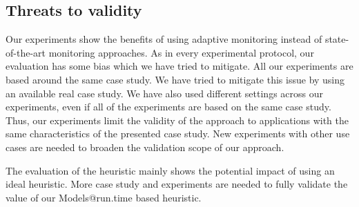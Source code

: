 \subsection{Threats to validity}
Our experiments show the benefits of using adaptive monitoring instead of state-of-the-art monitoring approaches.
As in every experimental protocol, our evaluation has some bias which we have tried to mitigate.
All our experiments are based around the same case study. 
We have tried to mitigate this issue by using an available real case study.
We have also used different settings across our experiments, even if all of the experiments are based on the same case study.
Thus, our experiments limit the validity of the approach to applications with the same characteristics of the presented case study.
New experiments with other use cases are needed to broaden the validation scope of our approach.

The evaluation of the heuristic mainly shows the potential impact of using an ideal heuristic. 
More case study and experiments are needed to fully validate the value of our Models@run.time based heuristic.